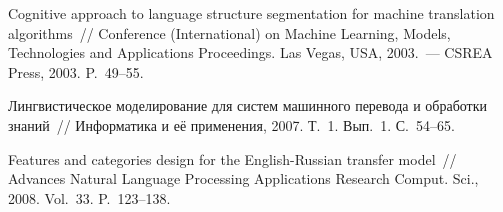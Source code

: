 \begin{multicols}{2}
{{\begin{thebibliography}{99}
    Cognitive approach to language structure segmentation for machine 
translation algorithms~// Conference (International) on Machine 
Learning, Models, Technologies and Applications Proceedings. Las Vegas, USA, 2003.~--- 
CSREA Press, 2003. P.~49--55.
    

\label{end\stat}
    
    Лингвистическое моделирование для систем машинного перевода и 
обработки знаний~// Информатика и её применения, 2007. Т.~1. Вып.~1. 
С.~54--65.

    Features and categories design for the English-Russian transfer model~// 
Advances Natural Language Processing Applications Research  
Comput. Sci., 2008. Vol.~33. P.~123--138.
    
 \end{thebibliography}
}
}

\end{multicols}